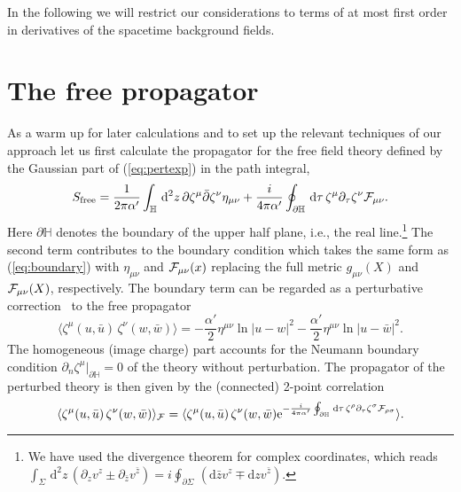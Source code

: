 \documentclass[a4paper,12pt]{article}
\let\bra=\langle        \let\ket=\rangle
\newcommand {\ud} {\mathrm{d}}
\newcommand {\cF} {{\cal F}}
\newcommand {\bbH}{\mathbb{H}}
\begin{document}
In the following we will restrict our considerations to terms of 
at most first order in derivatives of the spacetime background fields.

\section{The free propagator}
\label{sec:prop}

As a warm up for later calculations and to set up the relevant 
techniques of our approach let us first calculate the propagator for the 
free field theory defined by the Gaussian part of (\ref{eq:pertexp})
in the path integral,
\begin{equation}
  \label{eq:freeaction}
  S_\mathrm{free} = \frac 1{2\pi\alpha'} \int _\bbH \, \ud^2z \,
        {\partial \zeta^\mu \bar\partial \zeta^\nu \eta_{\mu\nu}}
    + \frac i{4\pi\alpha'} \oint _{\partial\bbH} \, \ud \tau \,
      {\zeta^\mu \partial_\tau \zeta^\nu \cF_{\mu\nu}}.
\end{equation}
Here $\partial\bbH$ denotes the boundary of the upper half plane, i.e., 
the real line.\footnote{We have used the divergence theorem for complex 
coordinates, which reads 
$\int _\Sigma\,\ud^2z \,{(\partial_z v^z \pm\partial_{\bar z}v^{\bar z})}=i\oint _{\partial \Sigma} \,{(\ud \bar z v^z \mp \ud z v^{\bar z} )}.$}
The second term contributes to the boundary condition which 
takes the same form as (\ref{eq:boundary}) with $\eta_{\mu\nu}$ and 
$\cF_{\mu\nu}(x)$ replacing the full metric $g_{\mu\nu}(X)$ and 
$\cF_{\mu\nu}(X)$, respectively. The boundary term can be regarded as a 
perturbative correction~\cite{Schomerus:1999ug} to the free propagator
\begin{equation}
  \label{eq:freeprop}
  \bra\zeta^\mu(u,\bar u)\,\zeta^\nu(w,\bar w)\ket = 
                      - \frac {\alpha'}2 \eta^{\mu\nu}\ln |u-w|^2
                      - \frac {\alpha'}2 \eta^{\mu\nu}\ln |u-\bar w|^2.
\end{equation}
The homogeneous (image charge) part accounts for the Neumann boundary condition
$\partial_n \zeta^\mu |_{\partial \bbH} = 0$ of the theory without 
perturbation. The propagator of the perturbed theory is then given by
the (connected) 2-point correlation
\begin{equation}
  \label{eq:freepropF}
  \bra \zeta^\mu(u,\bar u)\,\zeta^\nu(w,\bar w)\ket_\cF = 
  \bra \zeta^\mu(u,\bar u)\,\zeta^\nu(w,\bar w) 
      \mathrm{e}^{-\frac i{4\pi\alpha'} 
                 \oint _{\partial\bbH} \, \ud \tau \,
                 {\zeta^\rho \partial_\tau \zeta^\sigma \cF_{\rho\sigma}}}\ket.
\end{equation}
\end{document}

